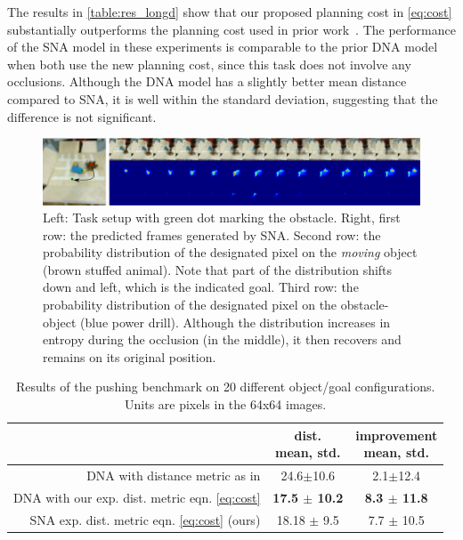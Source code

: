 The results in \autoref{table:res_longd} show that our proposed planning cost in \autoref{eq:cost} substantially outperforms the planning cost used in prior work~\cite{foresight}. The performance of the SNA model in these experiments is comparable to the prior DNA model~\cite{foresight} when both use the new planning cost, since this task does not involve any occlusions. Although the DNA model has a slightly better mean distance compared to SNA, it is well within the standard deviation, suggesting that the difference is not significant.

\begin{figure}
\centering
\includegraphics[width=1\linewidth]{images_sna/multiobject_qualitative/avoid_obstacle.pdf}
\caption{Left: Task setup with green dot marking the obstacle. Right, first row: the predicted frames generated by SNA. Second row: the probability distribution of the designated pixel on the \textit{moving} object (brown stuffed animal). Note that part of the distribution shifts down and left, which is the indicated goal. Third row: the probability distribution of the designated pixel on the obstacle-object (blue power drill). Although the distribution increases in entropy during the occlusion (in the middle), it then recovers and remains on its original position.
\label{fig:goingaroundocclusion}}
\end{figure}

\begin{table}
{\footnotesize
    \begin{center}
    \begin{tabular}{rcc}
    	\toprule
           &  \thead{dist. \\ mean, std.} & \thead{improvement \\ mean, std.}  \\  
           \midrule
      DNA with distance metric as in \cite{foresight}  & 24.6$\pm$10.6 & 2.1$\pm$12.4 \\
      DNA with our exp. dist. metric eqn. \ref{eq:cost}  & \textbf{17.5 $\pm$ 10.2} &  \textbf{8.3 $\pm$ 11.8}\\ 
      SNA exp. dist. metric eqn. \ref{eq:cost} (ours) & 18.18 $\pm$ 9.5 & 7.7 $\pm$ 10.5\\
      \bottomrule
    \end{tabular}
    \end{center}
    }
    \caption{Results of the pushing benchmark on 20 different object/goal configurations. Units are pixels in the 64x64 images.}
    \label{table:res_longd}
\end{table}


